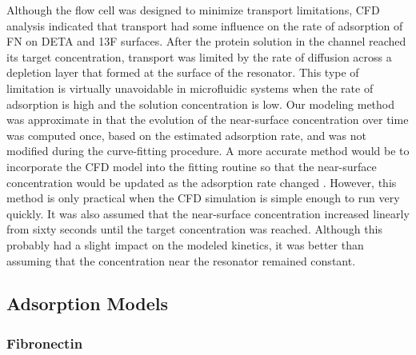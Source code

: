 Although the flow cell was designed to minimize transport limitations,
CFD analysis indicated that transport had some influence on the rate
of adsorption of FN on DETA and 13F surfaces. After the protein solution
in the channel reached its target concentration, transport was limited
by the rate of diffusion across a depletion layer that formed at the
surface of the resonator. This type of limitation is virtually unavoidable
in microfluidic systems when the rate of adsorption is high and the
solution concentration is low. Our modeling method was approximate
in that the evolution of the near-surface concentration over time
was computed once, based on the estimated adsorption rate, and was
not modified during the curve-fitting procedure. A more accurate method
would be to incorporate the CFD model into the fitting routine so
that the near-surface concentration would be updated as the adsorption
rate changed \cite{Jenkins2004}. However, this method is only practical
when the CFD simulation is simple enough to run very quickly. It was
also assumed that the near-surface concentration increased linearly
from sixty seconds until the target concentration was reached. Although
this probably had a slight impact on the modeled kinetics, it was
better than assuming that the concentration near the resonator remained
constant.


\subsection{Adsorption Models}


\subsubsection{Fibronectin}

